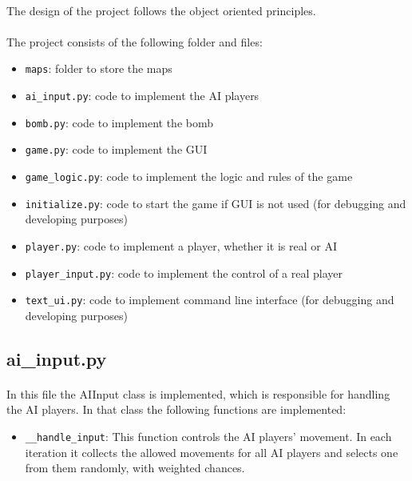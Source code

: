 \documentclass{article}
\begin{document}
    \paragraph{}
    The design of the project follows the object oriented principles.

    \paragraph{}
    The project consists of the following folder and files:
    \begin{itemize}
        \item \verb|maps|: folder to store the maps
        \item \verb|ai_input.py|: code to implement the AI players
        \item \verb|bomb.py|: code to implement the bomb
        \item \verb|game.py|: code to implement the GUI
        \item \verb|game_logic.py|: code to implement the logic and rules of the game
        \item \verb|initialize.py|: code to start the game if GUI is not used (for debugging and developing purposes)
        \item \verb|player.py|: code to implement a player, whether it is real or AI
        \item \verb|player_input.py|: code to implement the control of a real player
        \item \verb|text_ui.py|: code to implement command line interface (for debugging and developing  purposes)
    \end{itemize}

    \subsection{ai\_input.py}
        \paragraph{}
        In this file the AIInput class is implemented, which is responsible for handling the AI players. In that class the following functions are implemented:
        \begin{itemize}
            \item \verb|__handle_input|: This function controls the AI players' movement. In each iteration it collects the allowed movements for all AI players and selects one from them randomly, with weighted chances.
        \end{itemize}
\end{document}
